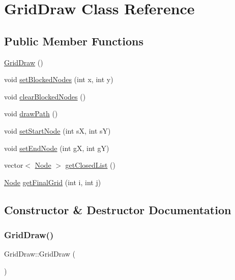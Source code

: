 \hypertarget{classGridDraw}{}\section{Grid\+Draw Class Reference}
\label{classGridDraw}
\subsection*{Public Member Functions}
\begin{DoxyCompactItemize}
\item 
\hyperlink{classGridDraw_a76e640c80be87e8cf63265d01910790c}{Grid\+Draw} ()
\item 
void \hyperlink{classGridDraw_afa57a983e74b8bafa3b8f6f05c5455be}{set\+Blocked\+Nodes} (int x, int y)
\item 
void \hyperlink{classGridDraw_a091e7771219ae06092243170f4f0af3e}{clear\+Blocked\+Nodes} ()
\item 
void \hyperlink{classGridDraw_af6f905b2a61590c2d8582798e54a7d02}{draw\+Path} ()
\item 
void \hyperlink{classGridDraw_aeaef2de4037646f14f31dcbe4e770493}{set\+Start\+Node} (int sX, int sY)
\item 
void \hyperlink{classGridDraw_ae484a45193bd941122c5393705e4246f}{set\+End\+Node} (int gX, int gY)
\item 
vector$<$ \hyperlink{structNode}{Node} $>$ \hyperlink{classGridDraw_a72cff94711f11c2af81d66eef964d15b}{get\+Closed\+List} ()
\item 
\hyperlink{structNode}{Node} \hyperlink{classGridDraw_aa4c5ec7b24e2c2d0004bc22e7453f791}{get\+Final\+Grid} (int i, int j)
\end{DoxyCompactItemize}


\subsection{Constructor \& Destructor Documentation}
\mbox{\label{classGridDraw_a76e640c80be87e8cf63265d01910790c}} 
\subsubsection{\texorpdfstring{Grid\+Draw()}{GridDraw()}}
{\footnotesize\ttfamily Grid\+Draw\+::\+Grid\+Draw (\begin{DoxyParamCaption}{ }\end{DoxyParamCaption})\hspace{0.3cm}{\ttfamily [inline]}}

